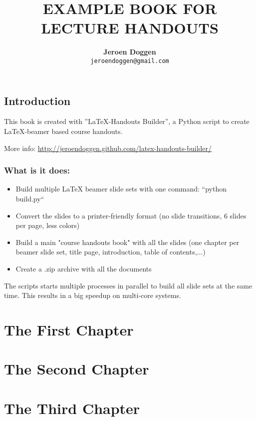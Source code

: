 \documentclass{book}
\title{\LARGE \textbf{\uppercase{ Example Book for Lecture  Handouts}}}
\author{\textbf{Jeroen Doggen}  \\
        \texttt{jeroendoggen@gmail.com}
}
\begin{document}
\maketitle
\tableofcontents

\chapter*{Introduction}
\label{chap_intro}

This book is created with ''\LaTeX -Handouts Builder'', a Python script to create \LaTeX-beamer based course handouts.

\noindent More info: \url{http://jeroendoggen.github.com/latex-handouts-builder/}


\section*{What is it does:}

\begin{itemize}
\item Build multiple LaTeX beamer slide sets with one command: ``python build.py``
\item Convert the slides to a printer-friendly format (no slide transitions, 6 slides per page, less colors)
\item Build a main "course handouts book" with all the slides (one chapter per beamer slide set, title page, introduction, table of contents,...)
\item Create a .zip archive with all the documents
\end{itemize}

\noindent The scripts starts multiple processes in parallel to build all slide sets at the same time. This results in a big speedup on multi-core systems.

\part{The First Chapter}


\part{The Second Chapter}


\part{The Third Chapter}

\end{document}
